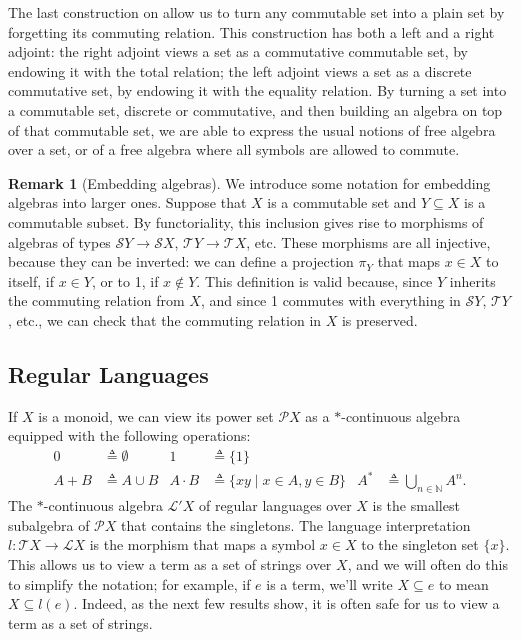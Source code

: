 \documentclass[11pt,a4paper]{amsart}
\theoremstyle{definition}
\newtheorem{remark}[theorem]{Remark}
\begin{document}
The last construction on  allow us to turn any
commutable set into a plain set by forgetting its commuting relation.  This
construction has both a left and a right adjoint: the right adjoint views a set
as a commutative commutable set, by endowing it with the total relation; the
left adjoint views a set as a discrete commutative set, by endowing it with the
equality relation.  By turning a set into a commutable set, discrete or
commutative, and then building an algebra on top of that commutable set, we are
able to express the usual notions of free algebra over a set, or of a free
algebra where all symbols are allowed to commute.

\begin{remark}[Embedding algebras]
\label{rem:embeddings}
We introduce some notation for embedding algebras into larger ones.  Suppose
that $X$ is a commutable set and $Y  \subseteq  X$ is a commutable subset.  By
functoriality, this inclusion gives rise to morphisms of algebras of types
$\mathcal{S}Y  \to  \mathcal{S}X$, $\mathcal{T}Y  \to  \mathcal{T}X$, etc. These
morphisms are all injective, because they can be inverted: we can define a
projection $ \pi _Y$ that maps $x  \in  X$ to itself, if $x  \in  Y$, or to 1, if $x  \notin  Y$.
This definition is valid because, since $Y$ inherits the commuting relation from
$X$, and since 1 commutes with everything in $\mathcal{S}Y$, $\mathcal{T}Y$,
etc., we can check that the commuting relation in $X$ is preserved.
\end{remark}

\subsection{Regular Languages}

If $X$ is a monoid, we can view its power set $\mathcal{P}X$ as a $*$-continuous
algebra equipped with the following operations:
\begin{align*}
  0 &  \triangleq   \emptyset  &
  1 &  \triangleq  \{1\} \\
  A + B &  \triangleq  A  \cup  B &
  A  \cdot  B &  \triangleq  \{ xy  \mid  x  \in  A, y  \in  B \} &
  A^* &  \triangleq   \bigcup _{n  \in  \mathbb{N}} A^n.
\end{align*}
The $*$-continuous algebra $\mathcal{L}'X$ of regular languages over $X$ is the
smallest subalgebra of $\mathcal{P}X$ that contains the singletons.  The
language interpretation $l : \mathcal{T}X \to \mathcal{L}X$ is the morphism that
maps a symbol $x \in X$ to the singleton set $\{x\}$.  This allows us to view a
term as a set of strings over $X$, and we will often do this to simplify the
notation; for example, if $e$ is a term, we'll write $X \subseteq e$ to mean
$X \subseteq l(e)$.  Indeed, as the next few results show, it is often safe for
us to view a term as a set of strings.
\end{document}
